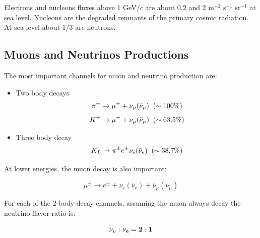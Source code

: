 \documentclass[
  letterpaper,
  DIV=11,
  numbers=noendperiod]{scrreprt}
\begin{document}
Electrons and nucleons fluxes above 1 GeV/\(c\) are about 0.2 and 2
m\(^{-2}\) s\(^{-1}\) sr\(^{-1}\) at sea level. Nucleons are the
degraded remnants of the primary cosmic radiation. At sea level about
1/3 are neutrons.

\subsection*{Muons and Neutrinos
Productions}\label{muons-and-neutrinos-productions}

The most important channels for muon and neutrino production are:

\begin{itemize}
\item
  Two body decays
  \[\pi^{\pm} \rightarrow \mu^{\pm} + \nu_{\mu}({ \bar \nu_\mu}) \rm{\;\; (\sim 100\%)}\]
  \[K^{\pm} \rightarrow \mu^{\pm} + \nu_{\mu}({\bar \nu_\mu}) \rm{\;\; (\sim 63.5\%)}\]
\item
  Three body decay
  \[K_L \rightarrow \pi^{\pm} e^{\pm}\nu_e({\bar \nu_e}) \rm{\;\; (\sim 38.7\%)}\]
\end{itemize}

At lower energies, the muon decay is also important:

\[ \mu^{\pm} \rightarrow e^{\pm} + \nu_{e}({\bar \nu_e}) + {\bar \nu_{\mu}}(\nu_\mu)\]

For each of the 2-body decay channels, assuming the muon always decay
the neutrino flavor ratio is:

\[\bf{ \nu_\mu : \nu_e = 2:1}\]
\end{document}
